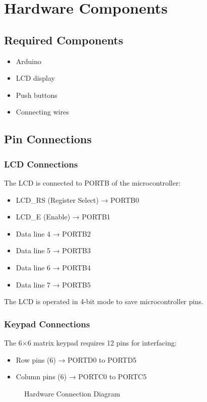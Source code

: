 \documentclass[12pt]{article}
\begin{document}
\section{Hardware Components}
\subsection{Required Components}
\begin{itemize}
\item Arduino
\item LCD display
\item Push buttons
\item Connecting wires
\end{itemize}
\subsection{Pin Connections}
\subsubsection{LCD Connections}
The LCD is connected to PORTB of the microcontroller:
\begin{itemize}
    \item LCD\_RS (Register Select) → PORTB0
    \item LCD\_E (Enable) → PORTB1
    \item Data line 4 → PORTB2
\item Data line 5 → PORTB3
\item Data line 6 → PORTB4
\item Data line 7 → PORTB5
\end{itemize}
The LCD is operated in 4-bit mode to save microcontroller pins.
\subsubsection{Keypad Connections}
The 6×6 matrix keypad requires 12 pins for interfacing:
\begin{itemize}
\item Row pins (6) → PORTD0 to PORTD5
\item Column pins (6) → PORTC0 to PORTC5
\end{itemize}
\begin{figure}[H]
\centering
{}
\caption{Hardware Connection Diagram}
\end{figure}
\end{document}
